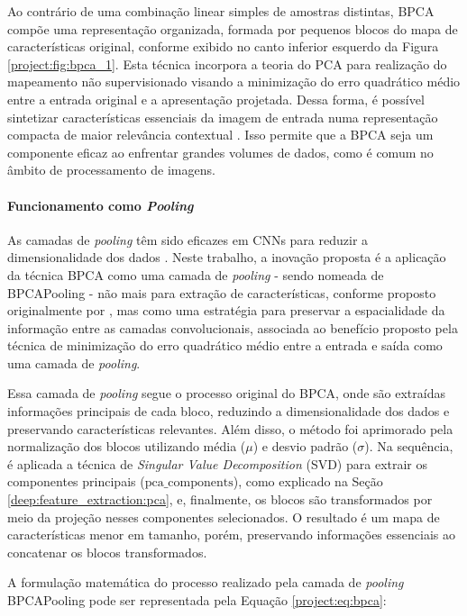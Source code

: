 Ao contrário de uma combinação linear simples de amostras distintas, BPCA compõe uma representação organizada, formada por pequenos blocos do mapa de características original, conforme exibido no canto inferior esquerdo da Figura \ref{project:fig:bpca_1}. Esta técnica incorpora a teoria do PCA para realização do mapeamento não supervisionado visando a minimização do erro quadrático médio entre a entrada original e a apresentação projetada. Dessa forma, é possível sintetizar características essenciais da imagem de entrada numa representação compacta de maior relevância contextual \citep{Kuncheva2014PCAData}. Isso permite que a BPCA seja um componente eficaz ao enfrentar grandes volumes de dados, como é comum no âmbito de processamento de imagens.

\paragraph{Funcionamento como \textit{Pooling}}
\label{project:bpca:pooling}
As camadas de \textit{pooling} têm sido eficazes em CNNs para reduzir a dimensionalidade dos dados \citep{Paul2019DimensionalityPooling}. Neste trabalho, a inovação proposta é a aplicação da técnica BPCA como uma camada de \textit{pooling} - sendo nomeada de BPCAPooling - não mais para extração de características, conforme proposto originalmente por \cite{Salvadeo2011}, mas como uma estratégia para preservar a espacialidade da informação entre as camadas convolucionais, associada ao benefício proposto pela técnica de minimização do erro quadrático médio entre a entrada e saída como uma camada de \textit{pooling}.

Essa camada de \textit{pooling} segue o processo original do BPCA, onde são extraídas informações principais de cada bloco, reduzindo a dimensionalidade dos dados e preservando características relevantes. Além disso, o método foi aprimorado pela normalização dos blocos utilizando média ($\mu$) e desvio padrão ($\sigma$). Na sequência, é aplicada a técnica de \textit{Singular Value Decomposition} (SVD) para extrair os componentes principais ($\text{{pca\_components}}$), como explicado na Seção \ref{deep:feature_extraction:pca}, e, finalmente, os blocos são transformados por meio da projeção nesses componentes selecionados. O resultado é um mapa de características menor em tamanho, porém, preservando informações essenciais ao concatenar os blocos transformados.

A formulação matemática do processo realizado pela camada de \textit{pooling} BPCAPooling pode ser representada pela Equação \ref{project:eq:bpca}:

